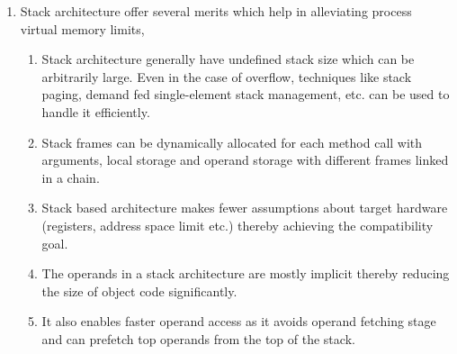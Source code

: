 \documentclass[11pt,a4paper,oneside]{article}
\begin{document}
\begin{enumerate}
		\item Stack architecture offer several merits which help in alleviating process virtual memory limits,
		\begin{enumerate}
			\item Stack architecture generally have undefined stack size which can be arbitrarily large. Even in the case of overflow, techniques like stack paging, demand fed single-element stack management, etc. can be used to handle it efficiently.
			\item Stack frames can be dynamically allocated for each method call with arguments, local storage and operand storage with different frames linked in a chain. 
			\item Stack based architecture makes fewer assumptions about target hardware (registers, address space limit etc.) thereby achieving the compatibility goal.
			\item The operands in a stack architecture are mostly implicit thereby reducing the size of object code significantly.
			\item It also enables faster operand access as it avoids operand fetching stage and can prefetch top operands from the top of the stack.
		\end{enumerate}
		

\end{enumerate}
\end{document}
